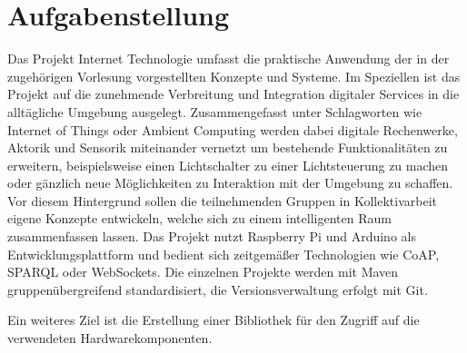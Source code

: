 \chapter{Aufgabenstellung}
\label{cha:intro}

Das Projekt Internet Technologie umfasst die praktische Anwendung der in der zugehörigen Vorlesung vorgestellten Konzepte und Systeme. Im Speziellen ist das Projekt auf die zunehmende Verbreitung und Integration digitaler Services in die alltägliche Umgebung ausgelegt. Zusammengefasst unter Schlagworten wie Internet of Things oder Ambient Computing werden dabei digitale Rechenwerke, Aktorik und Sensorik miteinander vernetzt um bestehende Funktionalitäten zu erweitern, beispielsweise einen Lichtschalter zu einer Lichtsteuerung zu machen oder gänzlich neue Möglichkeiten zu Interaktion mit der Umgebung zu schaffen. \\

Vor diesem Hintergrund sollen die teilnehmenden Gruppen in Kollektivarbeit eigene Konzepte entwickeln, welche sich zu einem intelligenten Raum zusammenfassen lassen. Das Projekt nutzt Raspberry Pi und Arduino als Entwicklungsplattform und bedient sich zeitgemäßer Technologien wie CoAP, SPARQL oder WebSockets. Die einzelnen Projekte werden mit Maven gruppenübergreifend standardisiert, die Versionsverwaltung erfolgt mit Git.

Ein weiteres Ziel ist die Erstellung einer Bibliothek für den Zugriff auf die verwendeten Hardwarekomponenten.